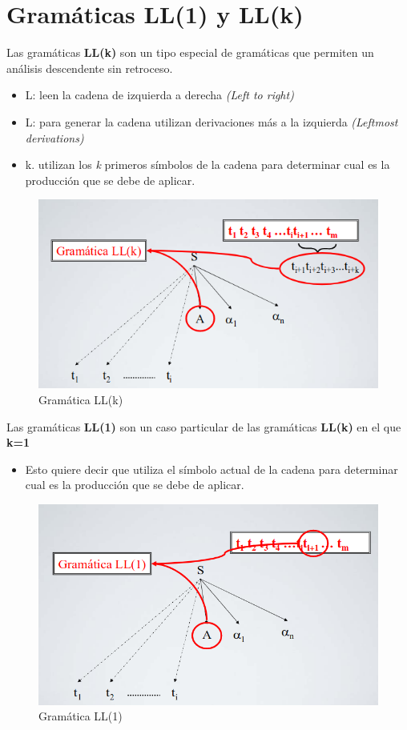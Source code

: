 \section{Gramáticas LL(1) y LL(k)}
Las gramáticas \textbf{LL(k)} son un tipo especial de gramáticas que permiten un análisis descendente sin retroceso. \cite{PL2}
\begin{itemize}
	\item L: leen la cadena de izquierda a derecha \textit{(Left to right)}
	\item L: para generar la cadena utilizan derivaciones más a la izquierda \textit{(Leftmost derivations)}
	\item k. utilizan los \textit{k} primeros símbolos de la cadena para determinar cual es la producción que se debe de aplicar.
\end{itemize}
\begin{figure}[h]
	\centering
	\includegraphics[width=0.5\linewidth]{img/22}
	\caption{Gramática LL(k)}
	\label{fig:2}
\end{figure}
Las gramáticas \textbf{LL(1)} son un caso particular de las gramáticas \textbf{LL(k)} en el que \textbf{k=1}
\newline
\begin{itemize}
	\item Esto quiere decir que utiliza el símbolo actual de la cadena para determinar cual es la producción que se debe de aplicar. \cite{PL2}
	
\end{itemize}

\begin{figure}[h]
	\centering
	\includegraphics[width=0.5\linewidth]{img/33}
	\caption{Gramática LL(1)}
	\label{fig:4}
\end{figure}
\clearpage 

